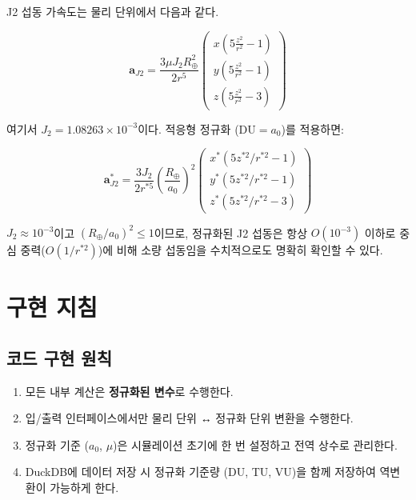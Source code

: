 \documentclass[11pt]{article}
\begin{document}
J2 섭동 가속도는 물리 단위에서 다음과 같다.

\begin{equation}
  \mathbf{a}_{J2} = \frac{3\mu J_2 R_\oplus^2}{2r^5}
  \begin{pmatrix}
    x\left(5\frac{z^2}{r^2} - 1\right)\\
    y\left(5\frac{z^2}{r^2} - 1\right)\\
    z\left(5\frac{z^2}{r^2} - 3\right)
  \end{pmatrix}
\end{equation}

여기서 $J_2 = 1.08263 \times 10^{-3}$이다.
적응형 정규화 ($\text{DU} = a_0$)를 적용하면:

\begin{equation}
  \mathbf{a}_{J2}^* = \frac{3 J_2}{2 r^{*5}} \left(\frac{R_\oplus}{a_0}\right)^2
  \begin{pmatrix}
    x^*\left(5 z^{*2}/r^{*2} - 1\right)\\
    y^*\left(5 z^{*2}/r^{*2} - 1\right)\\
    z^*\left(5 z^{*2}/r^{*2} - 3\right)
  \end{pmatrix}
  \label{eq:J2_normalized}
\end{equation}

$J_2 \approx 10^{-3}$이고 $(R_\oplus/a_0)^2 \leq 1$이므로, 정규화된 J2 섭동은 항상 $O(10^{-3})$ 이하로
중심 중력($O(1/r^{*2})$)에 비해 소량 섭동임을 수치적으로도 명확히 확인할 수 있다.

\section{구현 지침}

\subsection{코드 구현 원칙}

\begin{enumerate}
  \item 모든 내부 계산은 \textbf{정규화된 변수}로 수행한다.
  \item 입/출력 인터페이스에서만 물리 단위 ↔ 정규화 단위 변환을 수행한다.
  \item 정규화 기준 ($a_0$, $\mu$)은 시뮬레이션 초기에 한 번 설정하고 전역 상수로 관리한다.
  \item DuckDB에 데이터 저장 시 정규화 기준량 (DU, TU, VU)을 함께 저장하여 역변환이 가능하게 한다.
\end{enumerate}
\end{document}
